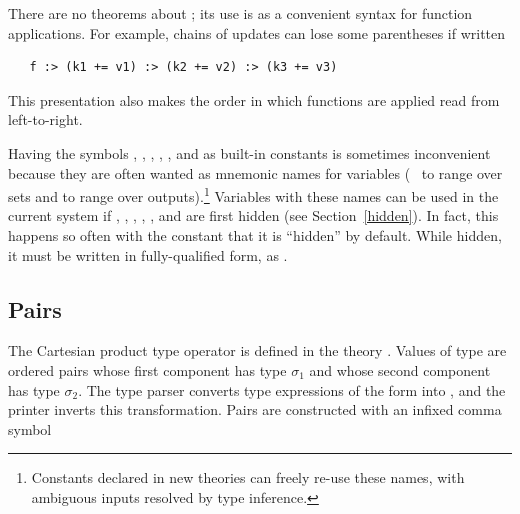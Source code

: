 There are no theorems about \ml{:>}; its use is as a convenient syntax for function applications.
For example, chains of updates can lose some parentheses if written
\begin{hol}
\begin{verbatim}
   f :> (k1 += v1) :> (k2 += v2) :> (k3 += v3)
\end{verbatim}
\end{hol}
This presentation also makes the order in which functions are applied read from left-to-right.

Having the symbols , , , , , and 
as built-in constants
%
%
is sometimes inconvenient because they are often wanted as mnemonic
names for variables (\eg\  to range over sets and  to
range over outputs).\footnote{Constants declared in new theories can
  freely re-use these names, with ambiguous inputs resolved by type
  inference.}  Variables with these names can be used in the current
system if , , , , , and  are first
hidden (see Section~\ref{hidden}).  In fact, this happens so often
with the constant  that it is ``hidden'' by default.  While
hidden, it must be written in fully-qualified form, as
.
%


\subsection{Pairs}\label{prod}

%
The Cartesian  product  type  operator
%
%
%
%
is defined in the theory . Values of type
 are ordered pairs whose first
component has type $\sigma_1$ and whose second component has type
$\sigma_2$.  The \HOL{} type parser
%
%
converts type expressions of the form 
%
%
into ,
%
%
and the printer inverts this transformation. Pairs
%
%
are constructed with an infixed comma symbol

